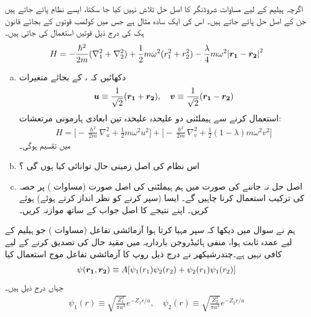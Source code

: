 اگرچہ ہیلیم کے لیے مساوات شروڈنگر کا اصل حل تلاش نہیں کیا جا سکتا، ایسے  نظام پائے جاتے ہیں جن کے اصل حل پائے جاتے ہیں۔ اس کی ایک سادہ مثال ہے جس میں کولمب قوتوں کے بجائے قانون ہک کی درج ذیل قوتیں استعمال کی جاتی ہیں۔
\begin{align}\label{مساوات_تغیریت_اصل_ہیملٹنی_ربڑی}
H=-\frac{\hslash^{2}}{2m}(\nabla_{1}^{2}+\nabla_{2}^{2})+\frac{1}{2}m\omega^{2}(r_{1}^{2}+r_{2}^{2})-\frac{\lambda}{4}m\omega^{2}\abs{{{\boldsymbol{r_{1}}}}-{{\boldsymbol{r_{2}}}}}^{2} 
\end{align}
\begin{enumerate}[a.]
\item
 دکھائیں کہ ،  کے بجائے متغیرات
\begin{align}
{\ensuremath{{\boldsymbol{u}}}}\equiv\frac{1}{\sqrt{2}}({{\boldsymbol{r_{1}}}}+{{\boldsymbol{r_{2}}}}), \quad {\ensuremath{{\boldsymbol{v}}}}\equiv\frac{1}{\sqrt{2}}({{\boldsymbol{r_{1}}}}-{{\boldsymbol{r_{2}}}})
\end{align}
 استعمال کرنے سے ہیملٹنی دو علیحدہ علیحدہ تین ابعادی ہارمونی مرتعشات:
\begin{align}
H=\Big[-\frac{\hslash^{2}}{2m}\nabla_{u}^{2}+\frac{1}{2}m\omega^{2}u^{2}\Big]+\Big[-\frac{\hslash^{2}}{2m}\nabla_{v}^{2}+\frac{1}{2}(1-\lambda)m\omega^{2}v^{2}\Big]
\end{align}
 میں تقسیم ہوگی۔
\item
 اس نظام کی اصل زمینی حال توانائی کیا ہوں گی ؟
\item
 اصل حل نہ جاننے کی صورت میں ہم ہیملٹنی کی اصل صورت (مساوات ) پر حصہ  کی ترکیب استعمال کرنا چاہیں گے۔
ایسا (سپر کرنے کو نظر انداز کرتے ہوئے) ہوئے کریں۔ اپنے نتیجے کا اصل جواب کے ساتھ موازنہ کریں۔  
\end{enumerate}
ہم نے سوال  میں دیکھا کہ سپر مہیا کرتا ہوا آزمائشی تفاعل (مساوات  ) جو ہیلیم کے لیے عمدہ ثابت ہوا، منفی ہائیڈروجن بارداریہ میں مقید حال کی تصدیق کرنے کے لیے کافی نہیں ہے۔چندرشیکھر نے درج ذیل روپ کا آزمائشی تفاعل موج استعمال کیا
\begin{align}
\psi({{\boldsymbol{r_{1}}}},{{\boldsymbol{r_{2}}}})\equiv A[\psi_{1}(r_{1})\psi_{2}(r_{2})+\psi_{2}(r_{1})\psi_{1}(r_{2})]
\end{align}
 جہاں درج ذیل ہیں۔
\begin{align}
\psi_{1}(r)\equiv \sqrt{\frac{Z_{1}^{3}}{\pi a^{3}}}e^{-Z_{1}r/a}, \quad \psi_{2}(r)\equiv \sqrt{\frac{Z_{2}^{3}}{\pi a^{3}}}e^{-Z_{2}r/a} 
\end{align}
 
